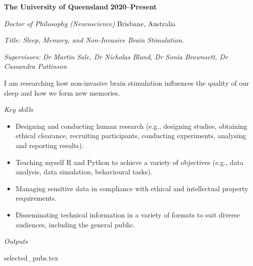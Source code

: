 \textbf{\large The University of Queensland} \hfill \textbf{2020--Present} \par
\vspace{1mm}
\textit{Doctor of Philosophy (Neuroscience)} \hfill Brisbane, Australia\par
\vspace{1mm}
\textit{Title: Sleep, Memory, and Non-Invasive Brain Stimulation.}\par
\vspace{1mm}
\textit{Supervisors: Dr Martin Sale, Dr Nicholas Bland, Dr Sonia Brownsett, Dr Cassandra Pattinson}\par
\vspace{1mm}
I am researching how non-invasive brain stimulation influences the quality of our sleep and how we form new memories.\par
\vspace{2mm}
\textit{Key skills} \par
\begin{itemize}
	\item Designing and conducting human research (e.g., designing studies, obtaining ethical clearance, recruiting participants, conducting experiments, analysing and reporting results).
	\item Teaching myself R and Python to achieve a variety of objectives (e.g., data analysis, data simulation, behavioural tasks).
	\item Managing sensitive data in compliance with ethical and intellectual property requirements.
	\item Disseminating technical information in a variety of formats to suit diverse audiences, including the general public.
\end{itemize}\par
\vspace{2mm}
\textit{Outputs}
\begin{enumerate}
	{selected_pubs.tex}
\end{enumerate}\par